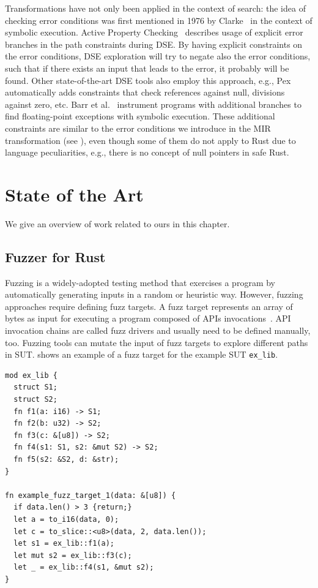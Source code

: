 \documentclass[paper=a4,%
  twoside,%
  BCOR4mm,%
  abstract=true,%
  toc=bibliography,%
  chapterprefix=true,%
  toc=bibliographynumbered,%
  open=right,%
  english,%
  pagesize=pdftex]{scrreprt}
\newcommand{\mir}{\ac{MIR}\xspace}
\begin{document}

Transformations have not only been applied in the context of search: the idea of checking error conditions was first mentioned in 1976 by Clarke~\cite{Clarke1976} in the context of symbolic execution. Active Property Checking~\cite{Godefroid_2005} describes usage of explicit error branches in the path constraints during \ac{DSE}. By having explicit constraints on the error conditions, \ac{DSE} exploration will try to negate also the error conditions, such that if there exists an input that leads to the error, it probably will be found. Other state-of-the-art \ac{DSE} tools also employ this approach, e.g., Pex~\cite{Tillmann2008} automatically adds constraints that check references against null, divisions against zero, etc. Barr et al.~\cite{Barr2013} instrument programs with additional branches to find floating-point exceptions with symbolic execution. These additional constraints are similar to the error conditions we introduce in the \mir transformation (see ), even though some of them do not apply to Rust due to language peculiarities, e.g., there is no concept of null pointers in safe Rust.

\clearpage
\chapter{State of the Art}
\label{chap:state-of-the-art}
We give an overview of work related to ours in this chapter. 

\section{Fuzzer for Rust}
Fuzzing is a widely-adopted testing method that exercises a program by automatically generating inputs in a random or heuristic way. However, fuzzing approaches require defining fuzz targets. A fuzz target represents an array of bytes as input for executing a program composed of \acp{API} invocations~\cite{Jiang2021}. \ac{API} invocation chains are called fuzz drivers and usually need to be defined manually, too. Fuzzing tools can mutate the input of fuzz targets to explore different paths in \ac{SUT}.  shows an example of a fuzz target for the example \ac{SUT} \texttt{ex\_lib}.

\begin{lstlisting}[style=boxed, caption={A sample problem for fuzz target generation~\cite{Jiang2021}}, label=lst:fuzz-target-example]
mod ex_lib {
  struct S1;
  struct S2;
  fn f1(a: i16) -> S1;
  fn f2(b: u32) -> S2;
  fn f3(c: &[u8]) -> S2;
  fn f4(s1: S1, s2: &mut S2) -> S2;
  fn f5(s2: &S2, d: &str);
}

fn example_fuzz_target_1(data: &[u8]) {
  if data.len() > 3 {return;}
  let a = to_i16(data, 0);
  let c = to_slice::<u8>(data, 2, data.len());
  let s1 = ex_lib::f1(a);
  let mut s2 = ex_lib::f3(c);
  let _ = ex_lib::f4(s1, &mut s2);
}
\end{lstlisting}
\end{document}
